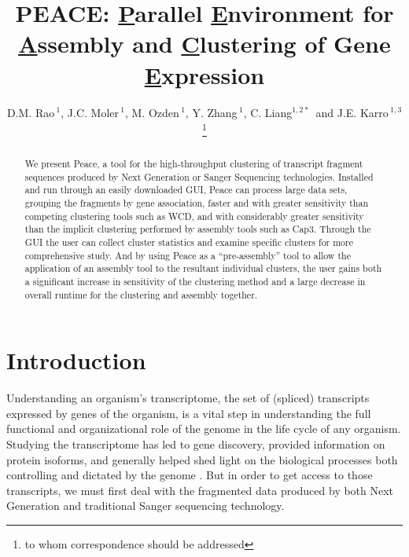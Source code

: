 \documentclass[a4,center,fleqn]{NAR}
\begin{document}
\title{PEACE: {\underline P}arallel {\underline E}nvironment for {\underline A}ssembly
  and {\underline C}lustering of Gene {\underline E}xpression}

\author{D.M. Rao\,$^{1}$, J.C. Moler\,$^{1}$, M. Ozden\,$^1$, Y. Zhang\,$^{1}$,
  C. Liang$^{1,2*}$\, and J.E. Karro\,$^{1,3}$\footnote{to whom
    correspondence should be addressed}}

\address{$^1$ Department of Computer Science and Software Engineering, \\
  $^2$ Department of Botany, \\
  $^3$ and Department of Microbiology, Miami University, Oxford, Ohio,
  USA}




\maketitle

\begin{abstract}
  We present {\sc Peace}, a tool for the high-throughput clustering of
  transcript fragment sequences produced by Next Generation or Sanger
  Sequencing technologies.  Installed and run through an easily
  downloaded GUI, {\sc Peace} can process large data sets, grouping the
  fragments by gene association, faster and with greater sensitivity
  than competing clustering tools such as {\sc WCD}, and with
  considerably greater sensitivity than the implicit clustering
  performed by assembly tools such as {\sc Cap3}.  Through the GUI the
  user can collect cluster statistics and examine specific
  clusters for more comprehensive study.  And by using {\sc Peace} as
  a ``pre-assembly'' tool to allow the application of an assembly tool
  to the resultant individual clusters, the user gains both a significant
  increase in sensitivity of the clustering method and a large decrease
  in overall runtime for the clustering and assembly together.
\end{abstract}


\section{Introduction}

Understanding an organism's transcriptome, the set of (spliced)
transcripts expressed by genes of the organism, is a vital step in
understanding the full functional and organizational role of the genome
in the life cycle of any organism.  Studying the transcriptome has led
to gene discovery, provided information on protein isoforms, and
generally helped shed light on the biological processes both
controlling and dictated by the genome \cite{Nagaraj07}.  But in order
to get access to those transcripts, we must first deal with the
fragmented data produced by both Next Generation and traditional
Sanger sequencing technology.
\end{document}
